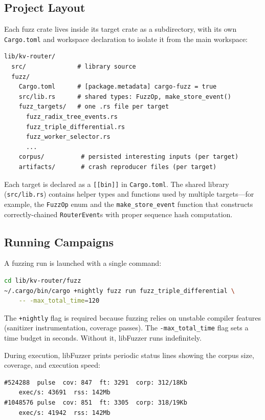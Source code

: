 \subsection{Project Layout}

Each fuzz crate lives inside its target crate as a subdirectory, with its own \texttt{Cargo.toml} and workspace declaration to isolate it from the main workspace:

\begin{lstlisting}[caption={Fuzz crate layout (kv-router example).}]
lib/kv-router/
  src/              # library source
  fuzz/
    Cargo.toml      # [package.metadata] cargo-fuzz = true
    src/lib.rs      # shared types: FuzzOp, make_store_event()
    fuzz_targets/   # one .rs file per target
      fuzz_radix_tree_events.rs
      fuzz_triple_differential.rs
      fuzz_worker_selector.rs
      ...
    corpus/          # persisted interesting inputs (per target)
    artifacts/       # crash reproducer files (per target)
\end{lstlisting}

Each target is declared as a \texttt{[[bin]]} in \texttt{Cargo.toml}. The shared library (\texttt{src/lib.rs}) contains helper types and functions used by multiple targets---for example, the \texttt{FuzzOp} enum and the \texttt{make\_store\_event} function that constructs correctly-chained \texttt{RouterEvent}s with proper sequence hash computation.

\subsection{Running Campaigns}

A fuzzing run is launched with a single command:

\begin{lstlisting}[language=bash,caption={Running a fuzz target for 120 seconds.}]
cd lib/kv-router/fuzz
~/.cargo/bin/cargo +nightly fuzz run fuzz_triple_differential \
    -- -max_total_time=120
\end{lstlisting}

The \texttt{+nightly} flag is required because fuzzing relies on unstable compiler features (sanitizer instrumentation, coverage passes). The \texttt{-max\_total\_time} flag sets a time budget in seconds. Without it, libFuzzer runs indefinitely.

During execution, libFuzzer prints periodic status lines showing the corpus size, coverage, and execution speed:

\begin{lstlisting}[caption={Typical libFuzzer output during a fuzzing run.}]
#524288  pulse  cov: 847  ft: 3291  corp: 312/18Kb
    exec/s: 43691  rss: 142Mb
#1048576 pulse  cov: 851  ft: 3305  corp: 318/19Kb
    exec/s: 41942  rss: 142Mb
\end{lstlisting}

